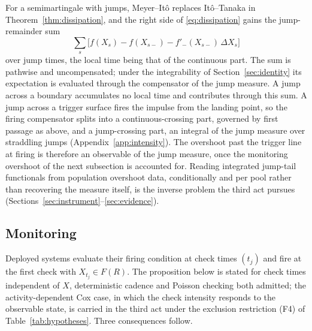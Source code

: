 \documentclass[11pt,a4paper]{article}
\theoremstyle{definition}
\theoremstyle{plain}
\theoremstyle{remark}
\begin{document}
For a semimartingale with jumps, Meyer--It\^o replaces It\^o--Tanaka in Theorem~\ref{thm:dissipation}, and the right side of \eqref{eq:dissipation} gains the jump-remainder sum
\[
\sum_s \big[ f(X_s) -
f(X_{s-}) - f'_-(X_{s-})\, \Delta X_s \big]
\]
over jump times, the local time being that of the continuous part.\cite{protter2005} The sum is pathwise and uncompensated; under the integrability of Section~\ref{sec:identity} its expectation 
is evaluated through the compensator of the jump measure. A jump across a boundary accumulates no local time and contributes through this sum. A jump across a trigger surface fires the impulse 
from the landing point, so the firing compensator splits into a continuous-crossing part, governed by first passage as above, and a jump-crossing part, an integral of the jump measure over 
straddling jumps (Appendix~\ref{app:intensity}). The overshoot past the trigger line at firing is therefore an observable of the jump measure, once the monitoring overshoot of the next 
subsection is accounted for. Reading integrated jump-tail functionals from population overshoot data, conditionally and per pool rather than recovering the measure itself, is the inverse 
problem the third act pursues (Sections~\ref{sec:instrument}--\ref{sec:evidence}).

\subsection{Monitoring}\label{sec:monitoring}

Deployed systems evaluate their firing condition at check times $(t_j)$ and fire at the first check with $X_{t_j} \in F(R)$. The proposition below is stated for check times independent 
of $X$, deterministic cadence and Poisson checking both admitted; the activity-dependent Cox case, in which the check intensity responds to the observable state, is carried in the third 
act under the exclusion restriction (F4) of Table~\ref{tab:hypotheses}. Three consequences follow.
\end{document}
